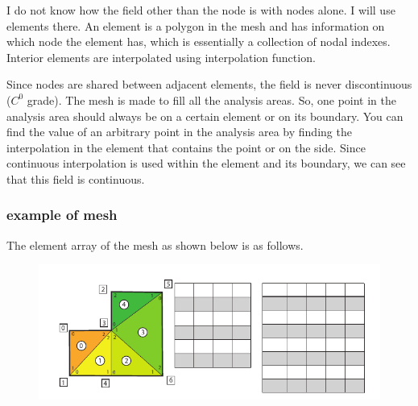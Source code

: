 I do not know how the field other than the node is with nodes alone. 
%
I will use elements there. 
%
An element is a polygon in the mesh and has information on which node the element has, which is essentially a collection of nodal indexes. 
%
Interior elements are interpolated using interpolation function.




Since nodes are shared between adjacent elements, the field is never discontinuous ($C^0$ grade). The mesh is made to fill all the analysis areas. So, one point in the analysis area should always be on a certain element or on its boundary. You can find the value of an arbitrary point in the analysis area by finding the interpolation in the element that contains the point or on the side. Since continuous interpolation is used within the element and its boundary, we can see that this field is continuous.

\subsubsection{example of mesh}
The element array of the mesh as shown below is as follows.
%
\begin{figure}[htbp!]
\centering
\includegraphics[width=120mm]{images/fem_data.pdf}
\end{figure}








